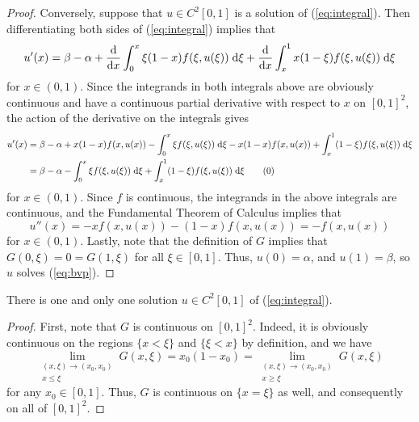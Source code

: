 \documentclass{homework}
\begin{document}
\begin{enumerate}[label=\textbf{(\roman*)}]
\begin{proof}
			Conversely, suppose that $u \in C^2[0,1]$ is a solution of (\ref{eq:integral}). Then differentiating both sides of (\ref{eq:integral}) implies that
			\begin{equation}
				\label{eq:diff_u1}
				u'(x) = \beta - \alpha + \frac{\text{d}}{\text{d} x}\int_0^x \xi(1-x)f(\xi, u(\xi))\;\text{d}\xi + \frac{\text{d}}{\text{d} x}\int_x^1 x(1-\xi)f(\xi,u(\xi))\;\text{d}\xi
			\end{equation}
			for $x \in (0,1)$. Since the integrands in both integrals above are obviously continuous and have a continuous partial derivative with respect to $x$ on $[0,1]^2$, the action of the derivative on the integrals gives
			\begin{align*}
				\label{eq:diff_u2}
				u'(x) &= \beta - \alpha + x(1-x)f(x,u(x)) -\int_0^x\xi f(\xi,u(\xi))\dee\xi - x(1-x)f(x,u(x))+\int_x^1(1-\xi)f(\xi,u(\xi))\dee\xi \\
				&= \beta - \alpha - \int_0^x\xi f(\xi,u(\xi))\dee\xi + \int_x^1(1-\xi)f(\xi,u(\xi))\dee\xi \tag{\arabic{equation}}\stepcounter{equation}
			\end{align*}
			for $x \in(0,1)$. Since $f$ is continuous, the integrands in the above integrals are continuous, and the Fundamental Theorem of Calculus implies that
			\begin{equation}
				\label{eq:diff_u3}
				u''(x) = -xf(x,u(x)) - (1-x)f(x,u(x)) = -f(x,u(x))
			\end{equation}
			for $x \in (0,1)$. Lastly, note that the definition of $G$ implies that $G(0,\xi) = 0 = G(1,\xi)$ for all $\xi \in [0,1]$. Thus, $u(0) = \alpha$, and $u(1) = \beta$, so $u$ solves (\ref{eq:bvp}).
		\end{proof}
		\questionpart There is one and only one solution $u \in C^2[0,1]$ of (\ref{eq:integral}).
		\begin{proof}
			First, note that $G$ is continuous on $[0,1]^2$. Indeed, it is obviously continuous on the regions $\{x < \xi\}$ and $\{\xi < x\}$ by definition, and we have
			\begin{equation}
				\lim_{\substack{(x,\xi)\to(x_0,x_0)\\x \le \xi}} G(x,\xi) = x_0(1-x_0) = \lim_{\substack{(x,\xi)\to (x_0,x_0)\\x \ge \xi}} G(x,\xi)
			\end{equation}
			for any $x_0 \in [0,1]$. Thus, $G$ is continuous on $\{x=\xi\}$ as well, and consequently on all of $[0,1]^2$.
			

\end{proof}
\end{enumerate}
\end{document}

